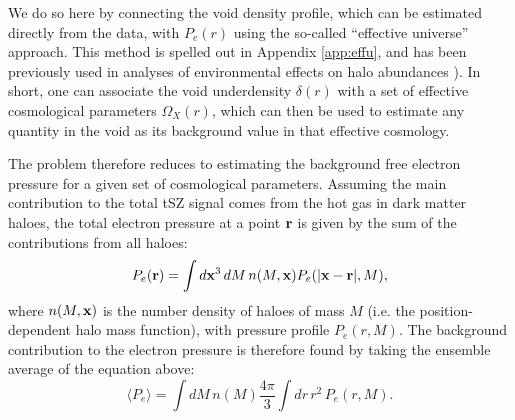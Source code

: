 \documentclass[twocolumn,amsfont,amssymb,amsmath, showpacs,balancelastpage, nofootinbib]{revtex4-1}
\begin{document}
    We do so here by connecting the void density profile, which can
    be estimated directly from the data, with $P_e(r)$ using the so-called ``effective universe''
    approach. This method is spelled out in Appendix \ref{app:effu}, and has been previously used
    in analyses of environmental effects on halo abundances \cite{2003MNRAS.344..715G,
    2004ApJ...605....1G,2009MNRAS.394.2109M,2015MNRAS.447.2683A}). In short, one can
    associate the void underdensity $\delta(r)$ with a set of effective cosmological parameters
    $\Omega_X(r)$, which can then be used to estimate any quantity in the void as its background
    value in that effective cosmology.
    
    The problem therefore reduces to estimating the background free electron pressure for a given
    set of cosmological parameters. Assuming the main contribution to the total tSZ signal comes
    from the hot gas in dark matter haloes, the total electron pressure at a point ${\bf r}$ is
    given by the sum of the contributions from all haloes:
    \begin{align}
      P_e({\bf r})=\int d{\bf x}^3\,dM\,n(M,{\bf x})P_e(|{\bf x}-{\bf r}|,M),
    \end{align}
    where $n(M,{\bf x})$ is the number density of haloes of mass $M$ (i.e. the position-dependent
    halo mass function), with pressure profile $P_e(r,M)$. The background contribution to the
    electron pressure is therefore found by taking the ensemble average of the equation above:
    \begin{equation}\label{eq:pe_bg}
      \langle P_e \rangle=\int dM\,n(M)\frac{4\pi}{3}\int dr\,r^2\,P_e(r,M).
    \end{equation}
    
\end{document}

